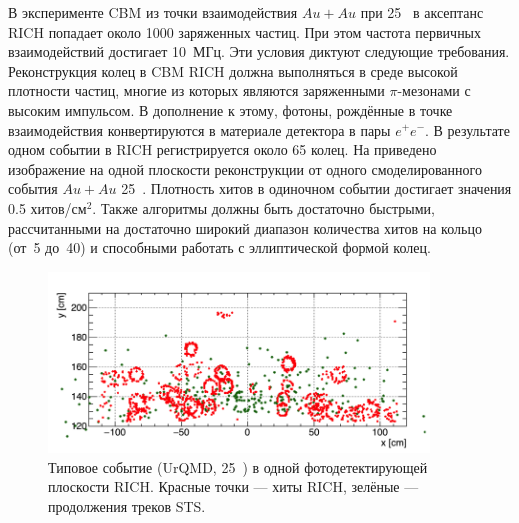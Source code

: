 \begin{minipage}[t]{0.495\textwidth}
В эксперименте CBM из точки взаимодействия $Au+Au$ при 25~\GeVperNucl{} в аксептанс RICH попадает около 1000 заряженных частиц. При этом частота первичных взаимодействий достигает 10~МГц. Эти условия диктуют следующие требования.
Реконструкция колец в CBM RICH должна выполняться в среде высокой плотности частиц, многие из которых являются заряженными $\pi$-мезонами с высоким импульсом. В дополнение к этому, фотоны, рождённые в точке взаимодействия конвертируются в материале детектора в пары $e^{+} e^{-}$. В результате одном событии в RICH регистрируется около 65 колец. На  приведено изображение на одной плоскости реконструкции от одного смоделированного события $Au+Au$ 25~\GeVperNucl{}. Плотность хитов в одиночном событии достигает значения 0.5 хитов/см$^{2}$. Также алгоритмы должны быть достаточно быстрыми, рассчитанными на достаточно широкий диапазон количества хитов на кольцо (от~5 до~40) и способными работать с эллиптической формой колец.
\end{minipage}

\begin{figure}[H]
\includegraphics[width=0.9\textwidth]{pictures/CbmRichOneEvent.png}
\caption{Типовое событие (UrQMD, 25~\GeVperNucl{}) в одной фотодетектирующей плоскости RICH. Красные точки --- хиты RICH, зелёные --- продолжения треков STS.}
\label{fig:CbmRichOneEvent}
\end{figure}

